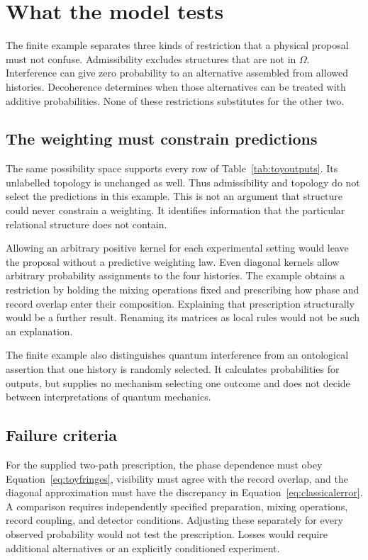 \section{What the model tests}
\label{sec:discussion}

The finite example separates three kinds of restriction that a physical
proposal must not confuse. Admissibility excludes structures that are not
in $\Omega$. Interference can give zero probability to an alternative
assembled from allowed histories. Decoherence determines when those
alternatives can be treated with additive probabilities. None of these
restrictions substitutes for the other two.

\subsection{The weighting must constrain predictions}

The same possibility space supports every row of
Table~\ref{tab:toyoutputs}. Its unlabelled topology is unchanged as well.
Thus admissibility and topology do not select the predictions in this
example. This is not an argument that structure could never constrain a
weighting. It identifies information that the particular relational
structure does not contain.

Allowing an arbitrary positive kernel for each experimental setting would
leave the proposal without a predictive weighting law. Even diagonal
kernels allow arbitrary probability assignments to the four histories.
The example obtains a restriction by holding the mixing operations fixed
and prescribing how phase and record overlap enter their composition.
Explaining that prescription structurally would be a further result.
Renaming its matrices as local rules would not be such an explanation.

The finite example also distinguishes quantum interference from an
ontological assertion that one history is randomly selected. It calculates
probabilities for outputs, but supplies no mechanism selecting one outcome
and does not decide between interpretations of quantum mechanics.

\subsection{Failure criteria}

For the supplied two-path prescription, the phase dependence must obey
Equation~\ref{eq:toyfringes}, visibility must agree with the record overlap,
and the diagonal approximation must have the discrepancy in
Equation~\ref{eq:classicalerror}. A comparison requires independently
specified preparation, mixing operations, record coupling, and detector
conditions. Adjusting these separately for every observed probability
would not test the prescription. Losses would require additional
alternatives or an explicitly conditioned experiment.

